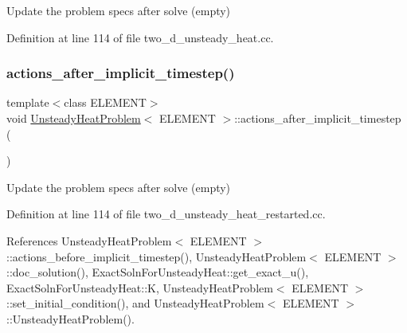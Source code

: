Update the problem specs after solve (empty) 



Definition at line 114 of file two\+\_\+d\+\_\+unsteady\+\_\+heat.\+cc.

\mbox{\label{classUnsteadyHeatProblem_afd14cbe343adfa39e3b8b2ca681c5020}} 
\subsubsection{\texorpdfstring{actions\+\_\+after\+\_\+implicit\+\_\+timestep()}{actions\_after\_implicit\_timestep()}\hspace{0.1cm}{\footnotesize\ttfamily [2/2]}}
{\footnotesize\ttfamily template$<$class E\+L\+E\+M\+E\+NT$>$ \\
void \hyperlink{classUnsteadyHeatProblem}{Unsteady\+Heat\+Problem}$<$ E\+L\+E\+M\+E\+NT $>$\+::actions\+\_\+after\+\_\+implicit\+\_\+timestep (\begin{DoxyParamCaption}{ }\end{DoxyParamCaption})\hspace{0.3cm}{\ttfamily [inline]}}



Update the problem specs after solve (empty) 



Definition at line 114 of file two\+\_\+d\+\_\+unsteady\+\_\+heat\+\_\+restarted.\+cc.



References Unsteady\+Heat\+Problem$<$ E\+L\+E\+M\+E\+N\+T $>$\+::actions\+\_\+before\+\_\+implicit\+\_\+timestep(), Unsteady\+Heat\+Problem$<$ E\+L\+E\+M\+E\+N\+T $>$\+::doc\+\_\+solution(), Exact\+Soln\+For\+Unsteady\+Heat\+::get\+\_\+exact\+\_\+u(), Exact\+Soln\+For\+Unsteady\+Heat\+::K, Unsteady\+Heat\+Problem$<$ E\+L\+E\+M\+E\+N\+T $>$\+::set\+\_\+initial\+\_\+condition(), and Unsteady\+Heat\+Problem$<$ E\+L\+E\+M\+E\+N\+T $>$\+::\+Unsteady\+Heat\+Problem().

\mbox{\label{classUnsteadyHeatProblem_a88e3d534b5904f7c10ce6a8fbd6df0ea}} 
